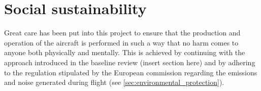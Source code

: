 \section{Social sustainability}
\label{sec:Social sustainability}
Great care has been put into this project to ensure that the production and operation of the aircraft is performed in such a way that no harm comes to anyone both physically and mentally. This is achieved by continuing with the approach introduced in the baseline review (insert section here) and by adhering to the regulation stipulated by the European commission regarding the emissions and noise generated during  flight (see \autoref{sec:environmental_protection}).        